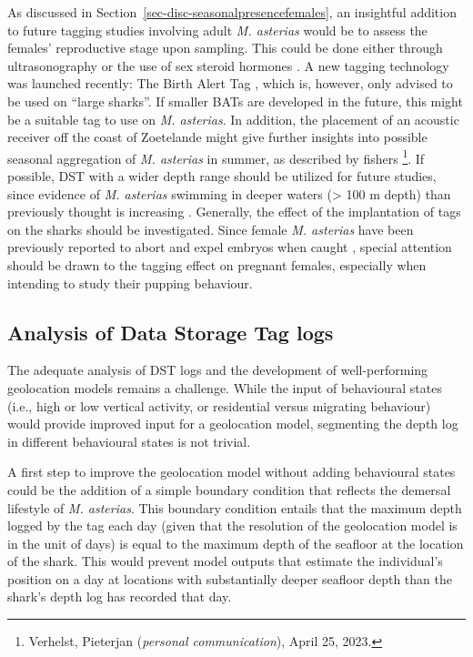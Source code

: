 \documentclass[
  authoryear,
  review,
  3p]{elsarticle}
\begin{document}
As discussed in Section~\ref{sec-disc-seasonalpresencefemales}, an
insightful addition to future tagging studies involving adult \emph{M.
asterias} would be to assess the females' reproductive stage upon
sampling. This could be done either through ultrasonography or the use
of sex steroid hormones
\citep{awruch_2014, smukall_2019, anderson_2018, fujinami_2020, fujinami_2021}.
A new tagging technology was launched recently: The Birth Alert Tag
\citep[BAT,][]{sulikowski_2023}, which is, however, only advised to be
used on ``large sharks''. If smaller BATs are developed in the future,
this might be a suitable tag to use on \emph{M. asterias}. In addition,
the placement of an acoustic receiver off the coast of Zoetelande might
give further insights into possible seasonal aggregation of \emph{M.
asterias} in summer, as described by fishers \footnote{Verhelst,
  Pieterjan (\emph{personal communication}), April 25, 2023.}. If
possible, DST with a wider depth range should be utilized for future
studies, since evidence of \emph{M. asterias} swimming in deeper waters
(\textgreater{} 100 m depth) than previously thought is increasing
\citep{ices_2019, griffiths_2020}. Generally, the effect of the
implantation of tags on the sharks should be investigated. Since female
\emph{M. asterias} have been previously reported to abort and expel
embryos when caught \citep{farrell_2010a}, special attention should be
drawn to the tagging effect on pregnant females, especially when
intending to study their pupping behaviour.

\hypertarget{analysis-of-data-storage-tag-logs}{%
\subsection{Analysis of Data Storage Tag
logs}\label{analysis-of-data-storage-tag-logs}}

The adequate analysis of DST logs and the development of well-performing
geolocation models remains a challenge. While the input of behavioural
states (i.e., high or low vertical activity, or residential versus
migrating behaviour) would provide improved input for a geolocation
model, segmenting the depth log in different behavioural states is not
trivial.

A first step to improve the geolocation model without adding behavioural
states could be the addition of a simple boundary condition that
reflects the demersal lifestyle of \emph{M. asterias}. This boundary
condition entails that the maximum depth logged by the tag each day
(given that the resolution of the geolocation model is in the unit of
days) is equal to the maximum depth of the seafloor at the location of
the shark. This would prevent model outputs that estimate the
individual's position on a day at locations with substantially deeper
seafloor depth than the shark's depth log has recorded that day.
\end{document}
